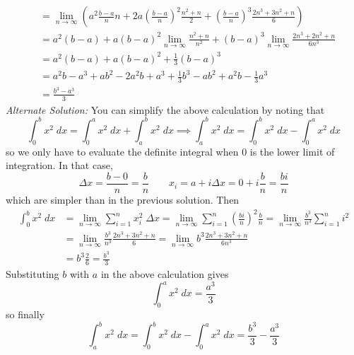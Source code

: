 \documentclass{article}
\begin{document}
\begin{enumerate}
\begin{align*}
    &= \lim_{n\to\infty} \left(a^2 \frac{b-a}{n} n +
      2a\left(\frac{b-a}{n}\right)^2 \frac{n^2+n}{2} +
      \left(\frac{b-a}{n}\right)^3 \frac{2n^3+3n^2+n}{6} \right)
    \\
    &= a^2(b-a) + a(b-a)^2 \lim_{n\to\infty} \frac{n^2+n}{n^2} +
      (b-a)^3 \lim_{n\to\infty} \frac{2n^3 + 2n^2 + n}{6n^3}
    \\
    &= a^2(b-a) + a(b-a)^2 + \frac{1}{3} (b-a)^3
    \\
    &= a^2 b - a^3 + ab^2 - 2a^2b + a^3 + \frac{1}{3} b^3 - ab^2 +
      a^2b - \frac{1}{3} a^3
    \\
    &= \frac{b^3-a^3}{3}
  \end{align*}
  \textit{Alternate Solution:} You can simplify the above calculation
  by noting that
  \begin{equation*}
    \int_0^b x^2 \; dx = \int_0^a x^2 \; dx + \int_a^b x^2 \; dx
    \implies \int_a^b x^2 \; dx = \int_0^b x^2 \; dx - \int_0^a x^2 \;
    dx
  \end{equation*}
  so we only have to evaluate the definite integral when $0$ is the
  lower limit of integration.  In that case,
  \begin{equation*}
    \Delta x = \frac{b-0}{n} = \frac{b}{n} \qquad x_i = a + i \Delta x
    = 0 + i \frac{b}{n} = \frac{bi}{n}
  \end{equation*}
  which are simpler than in the previous solution.  Then
  \begin{align*}
    \int_0^b x^2 \; dx
    &= \lim_{n\to\infty} \sum_{i=1}^n x_i^2 \; \Delta x
     = \lim_{n\to\infty} \sum_{i=1}^n \left(\frac{bi}{n}\right)^2
      \frac{b}{n}
    = \lim_{n\to\infty} \frac{b^3}{n^3} \sum_{i=1}^n i^2
    \\
    &= \lim_{n\to\infty} \frac{b^3}{n^3} \frac{2n^3+3n^2+n}{6}
    = \lim_{n\to\infty} b^3 \frac{2n^3+3n^2+n}{6n^3}
    \\
    &= b^3 \frac{2}{6} = \frac{b^3}{3}
  \end{align*}
  Substituting $b$ with $a$ in the above calculation gives
  \begin{equation*}
    \int_0^a x^2 \; dx = \frac{a^3}{3}
  \end{equation*}
  so finally
  \begin{equation*}
    \int_a^b x^2 \; dx = \int_0^b x^2 \; dx - \int_0^a x^2 \; dx
    = \frac{b^3}{3} - \frac{a^3}{3}
  \end{equation*}
\end{enumerate}
\end{document}
